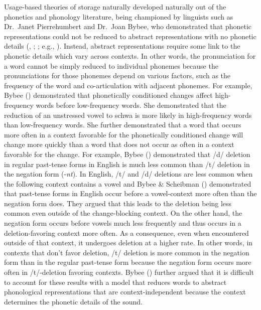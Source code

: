 \documentclass[
  12pt,
  letterpaper,
]{scrreport}
\begin{document}
Usage-based theories of storage naturally developed naturally out of the
phonetics and phonology literature, being championed by linguists such
as Dr.~Janet Pierrehumbert and Dr.~Joan Bybee, who demonstrated that
phonetic representations could not be reduced to abstract
representations with no phonetic details
(,
;
;
e.g.,
). Instead, abstract representations require some link to the
phonetic details which vary across contexts. In other words, the
pronunciation for a word cannot be simply reduced to individual phonemes
because the pronunciations for those phonemes depend on various factors,
such as the frequency of the word and co-articulation with adjacent
phonemes. For example, Bybee
() demonstrated that
phonetically conditioned changes affect high-frequency words before
low-frequency words. She demonstrated that the reduction of an
unstressed vowel to schwa is more likely in high-frequency words than
low-frequency words. She further demonstrated that a word that occurs
more often in a context favorable for the phonetically conditioned
change will change more quickly than a word that does not occur as often
in a context favorable for the change. For example, Bybee
() demonstrated that
/d/ deletion in regular past-tense forms in English is much less common
than /t/ deletion in the negation form (-\emph{nt}). In English, /t/ and
/d/ deletions are less common when the following context contains a
vowel and Bybee \& Scheibman
() demonstrated that
past-tense forms in English occur before a vowel-context more often than
the negation form does. They argued that this leads to the deletion
being less common even outside of the change-blocking context. On the
other hand, the negation form occurs before vowels much less frequently
and thus occurs in a deletion-favoring context more often. As a
consequence, even when encountered outside of that context, it undergoes
deletion at a higher rate. In other words, in contexts that don't favor
deletion, /t/ deletion is more common in the negation form than in the
regular past-tense form because the negation form occurs more often in
/t/-deletion favoring contexts. Bybee
() further argued that
it is difficult to account for these results with a model that reduces
words to abstract phonological representations that are
context-independent because the context determines the phonetic details
of the sound.
\end{document}
